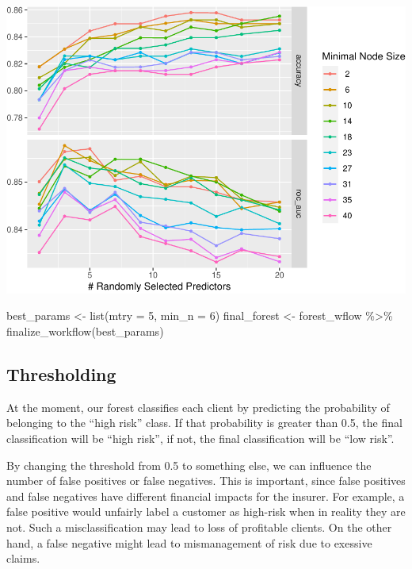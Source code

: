 \documentclass[
]{article}
\newenvironment{Shaded}{\begin{snugshade}}{\end{snugshade}}
\newcommand{\AttributeTok}[1]{\textcolor[rgb]{0.77,0.63,0.00}{#1}}
\newcommand{\DecValTok}[1]{\textcolor[rgb]{0.00,0.00,0.81}{#1}}
\newcommand{\FunctionTok}[1]{\textcolor[rgb]{0.00,0.00,0.00}{#1}}
\newcommand{\NormalTok}[1]{#1}
\newcommand{\OtherTok}[1]{\textcolor[rgb]{0.56,0.35,0.01}{#1}}
\newcommand{\SpecialCharTok}[1]{\textcolor[rgb]{0.00,0.00,0.00}{#1}}
\begin{document}
\includegraphics{figures/report/fig-unnamed-chunk-23-1.pdf}

\begin{Shaded}
\begin{Highlighting}[]
\NormalTok{best\_params }\OtherTok{\textless{}{-}} \FunctionTok{list}\NormalTok{(}\AttributeTok{mtry =} \DecValTok{5}\NormalTok{, }\AttributeTok{min\_n =} \DecValTok{6}\NormalTok{)}
\NormalTok{final\_forest }\OtherTok{\textless{}{-}}
\NormalTok{  forest\_wflow }\SpecialCharTok{\%\textgreater{}\%}
  \FunctionTok{finalize\_workflow}\NormalTok{(best\_params)}
\end{Highlighting}
\end{Shaded}

\hypertarget{thresholding}{%
\subsection{Thresholding}\label{thresholding}}

At the moment, our forest classifies each client by predicting the
probability of belonging to the ``high risk'' class. If that probability
is greater than 0.5, the final classification will be ``high risk'', if
not, the final classification will be ``low risk''.

By changing the threshold from 0.5 to something else, we can influence
the number of false positives or false negatives. This is important,
since false positives and false negatives have different financial
impacts for the insurer. For example, a false positive would unfairly
label a customer as high-risk when in reality they are not. Such a
misclassification may lead to loss of profitable clients. On the other
hand, a false negative might lead to mismanagement of risk due to
exessive claims.
\end{document}
